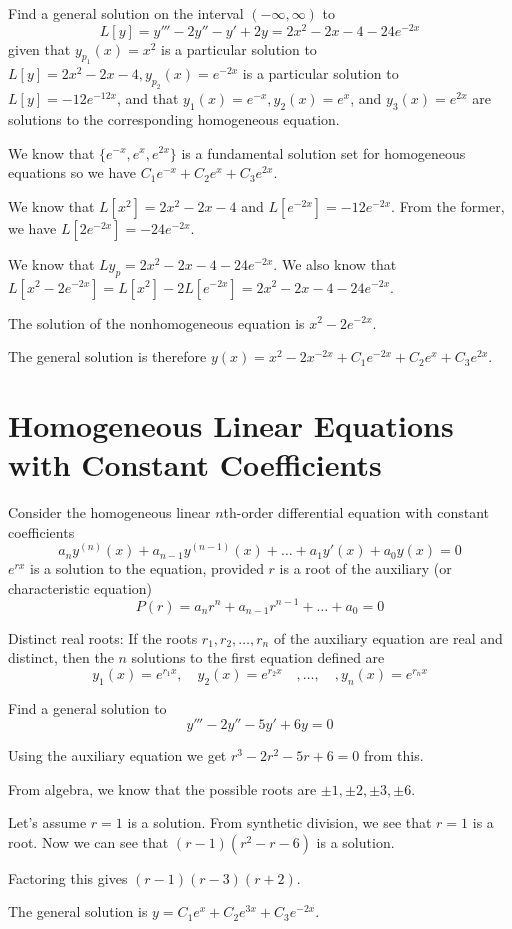 \documentclass[../diffeq.tex]{subfiles}
\begin{document}
\begin{example}
    Find a general solution on the interval $(-\infty,\infty)$ to 
    \[ L[y]=y'''-2y''-y'+2y=2x^2-2x-4-24e^{-2x}\]
    given that $y_{p_1}(x)=x^2$ is a particular solution to $L[y]=2x^2-2x-4, y_{p_2}(x)=e^{-2x}$ is a particular solution to $L[y]=-12e^{-12x}$, and that $y_1(x)=e^{-x},y_2(x)=e^x$, and $y_3(x)=e^{2x}$ are solutions to the corresponding homogeneous equation.

    We know that $\{e^{-x},e^x,e^{2x}\}$ is a fundamental solution set for homogeneous equations so we have $C_1e^{-x}+C_2e^x+C_3e^{2x}$.

    We know that $L[x^2]=2x^2-2x-4$ and $L[e^{-2x}]=-12e^{-2x}$. From the former, we have $L[2e^{-2x}]=-24e^{-2x}$.

    We know that $L{y_p}=2x^2-2x-4-24e^{-2x}$. We also know that $L[x^2-2e^{-2x}]=L[x^2]-2L[e^{-2x}]=2x^2-2x-4-24e^{-2x}$.

    The solution of the nonhomogeneous equation is $x^2-2e^{-2x}$.

    The general solution is therefore $y(x)=x^2-2x^{-2x}+C_1e^{-2x}+C_2e^x+C_3e^{2x}$.
\end{example}

\section{Homogeneous Linear Equations with Constant Coefficients}
Consider the homogeneous linear $n$th-order differential equation with constant coefficients 
\[ a_ny^{(n)}(x)+a_{n-1}y^{(n-1)}(x)+\dots + a_1y'(x)+a_0y(x)=0 \]
$e^{rx}$ is a solution to the equation, provided $r$ is a root of the auxiliary (or characteristic equation)
\[ P(r)=a_nr^n+a_{n-1}r^{n-1}+\dots+a_0 =0 \]

Distinct real roots: If the roots $r_1,r_2,\dots,r_n$ of the auxiliary equation are real and distinct, then the $n$ solutions to the first equation defined are 
\[ y_1(x)=e^{r_1x},\quad y_2(x)=e^{r_2x} \quad, \dots , \quad, y_n(x) = e^{r_nx} \]

\begin{example}
    Find a general solution to 
    \[ y'''-2y''-5y'+6y=0 \]

    Using the auxiliary equation we get $r^3-2r^2-5r+6=0$ from this.

    From algebra, we know that the possible roots are $\pm 1, \pm2, \pm3, \pm 6$.

    Let's assume $r=1$ is a solution. From synthetic division, we see that $r=1$ is a root. Now we can see that $(r-1)(r^2-r-6)$ is a solution. 

    Factoring this gives $(r-1)(r-3)(r+2)$.

    The general solution is $y=C_1e^x+C_2e^{3x}+C_3e^{-2x}$.   
\end{example}
\end{document}
